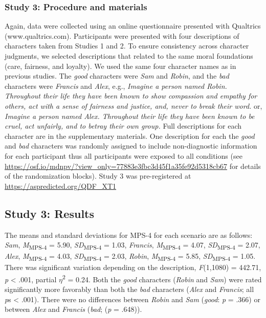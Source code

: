 \documentclass[
  american,
  man,floatsintext]{apa7}
\begin{document}
\hypertarget{study-3-procedure-and-materials}{%
\subsubsection{Study 3: Procedure and materials}\label{study-3-procedure-and-materials}}

Again, data were collected using an online questionnaire presented with Qualtrics (www.qualtrics.com). Participants were presented with four descriptions of characters taken from Studies 1 and 2. To ensure consistency across character judgments, we selected descriptions that related to the same moral foundations (care, fairness, and loyalty). We used the same four character names as in previous studies. The \emph{good} characters were \emph{Sam} and \emph{Robin}, and the \emph{bad} characters were \emph{Francis} and \emph{Alex}, e.g., \emph{Imagine a person named Robin. Throughout their life they have been known to show compassion and empathy for others, act with a sense of fairness and justice, and, never to break their word.} or, \emph{Imagine a person named Alex. Throughout their life they have been known to be cruel, act unfairly, and to betray their own group.} Full descriptions for each character are in the supplementary materials. One description for each the \emph{good} and \emph{bad} characters was randomly assigned to include non-diagnostic information for each participant thus all participants were exposed to all conditions (see \color{blue}\url{https://osf.io/mdnpv/?view_only=77883e3fbc3d45f1a35fe92d5318cb67}\color{black} for details of the randomization blocks). Study 3 was pre-registered at \color{blue}\url{https://aspredicted.org/QDF_XT1}\color{black}

\hypertarget{study-3-results}{%
\subsection{Study 3: Results}\label{study-3-results}}

The means and standard deviations for MPS-4 for each scenario are as follows:
\emph{Sam},
\emph{M}\textsubscript{MPS-4} = 5.90, \emph{SD}\textsubscript{MPS-4} = 1.03,
\emph{Francis},
\emph{M}\textsubscript{MPS-4} = 4.07, \emph{SD}\textsubscript{MPS-4} = 2.07,
\emph{Alex},
\emph{M}\textsubscript{MPS-4} = 4.03, \emph{SD}\textsubscript{MPS-4} = 2.03,
\emph{Robin},
\emph{M}\textsubscript{MPS-4} = 5.85, \emph{SD}\textsubscript{MPS-4} = 1.05. There was significant variation depending on the description, \emph{F}(1,1080) = 442.71, \emph{p} \textless{} .001, partial \(\eta\)\textsuperscript{2} = 0.24. Both the \emph{good} characters (\emph{Robin} and \emph{Sam}) were rated significantly more favorably than both the \emph{bad} characters (\emph{Alex} and \emph{Francis}; all \emph{p}s \textless{} .001). There were no differences between \emph{Robin} and \emph{Sam} (\emph{good}: \emph{p} = .366) or between \emph{Alex} and \emph{Francis} (\emph{bad}; (\emph{p} = .648)).
\end{document}
